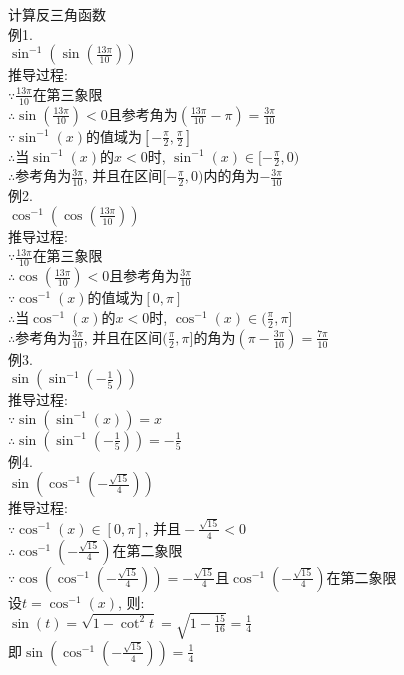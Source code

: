 计算反三角函数\\
例1.\\
\phantom{例}$\displaystyle\sin^{-1}(\sin(\frac{13\pi}{10}))$\\
推导过程:\\
$\displaystyle\because\frac{13\pi}{10}$在第三象限\\
$\displaystyle\therefore\sin(\frac{13\pi}{10})<0$且参考角为$(\frac{13\pi}{10}-\pi)=\frac{3\pi}{10}$\\
$\displaystyle\because\sin^{-1}(x)$的值域为$[-\frac{\pi}{2},\frac{\pi}{2}]$\\
$\displaystyle\therefore$当$\sin^{-1}(x)$的$x<0$时, $\sin^{-1}(x)\in[-\frac{\pi}{2},0)$\\
$\displaystyle\therefore$参考角为$\frac{3\pi}{10}$, 并且在区间$[-\frac{\pi}{2},0)$内的角为$-\frac{3\pi}{10}$\\[1ex]

例2.\\
\phantom{例}$\displaystyle\cos^{-1}(\cos(\frac{13\pi}{10}))$\\
推导过程:\\
$\displaystyle\because\frac{13\pi}{10}$在第三象限\\
$\displaystyle\therefore\cos(\frac{13\pi}{10})<0$且参考角为$\frac{3\pi}{10}$\\
$\displaystyle\because\cos^{-1}(x)$的值域为$[0,\pi]$\\
$\displaystyle\therefore$当$\cos^{-1}(x)$的$x<0$时, $\cos^{-1}(x)\in(\frac{\pi}{2},\pi]$\\
$\displaystyle\therefore$参考角为$\frac{3\pi}{10}$, 并且在区间$(\frac{\pi}{2},\pi]$的角为$(\pi-\frac{3\pi}{10})=\frac{7\pi}{10}$\\[1ex]

例3.\\
\phantom{例}$\displaystyle\sin(\sin^{-1}(-\frac{1}{5}))$\\
推导过程:\\
$\displaystyle\because\sin(\sin^{-1}(x))=x$\\
$\displaystyle\therefore\sin(\sin^{-1}(-\frac{1}{5}))=-\frac{1}{5}$\\[1ex]

例4.\\
\phantom{例}$\displaystyle\sin(\cos^{-1}(-\frac{\sqrt{15}}{4}))$\\
推导过程:\\
$\displaystyle\because\cos^{-1}(x)\in[0,\pi]\text{, 并且}-\frac{\sqrt{15}}{4}<0$\\
$\displaystyle\therefore\cos^{-1}(-\frac{\sqrt{15}}{4})$在第二象限\\
$\displaystyle\because\cos(\cos^{-1}(-\frac{\sqrt{15}}{4}))=-\frac{\sqrt{15}}{4}\text{且}\cos^{-1}(-\frac{\sqrt{15}}{4})$在第二象限\\
设$\displaystyle t=\cos^{-1}(x)$, 则:\\
$\displaystyle\sin(t)=\sqrt{1-\cot^2t}=\sqrt{1-\frac{15}{16}}=\frac{1}{4}$\\
即$\displaystyle\sin(\cos^{-1}(-\frac{\sqrt{15}}{4}))=\frac{1}{4}$\\[2ex]

